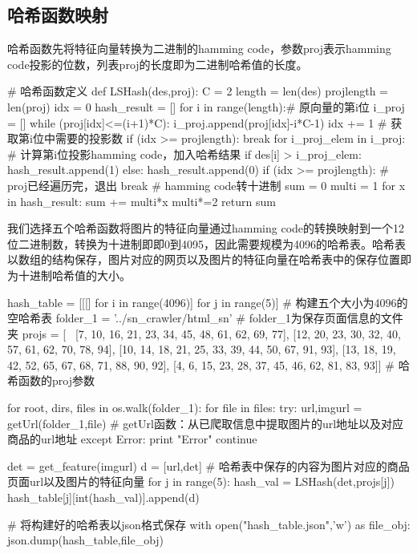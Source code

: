 \subsection{哈希函数映射}

哈希函数先将特征向量转换为二进制的hamming code，参数proj表示hamming code投影的位数，列表proj的长度即为二进制哈希值的长度。

\begin{python}
# 哈希函数定义
def LSHash(des,proj):
    C = 2
    length = len(des)
    projlength = len(proj)
    idx = 0
    hash_result = []
    for i in range(length):# 原向量的第i位
        i_proj = []
        while (proj[idx]<=(i+1)*C):
            i_proj.append(proj[idx]-i*C-1)
            idx += 1       # 获取第i位中需要的投影数
            if (idx >= projlength):
                break
        for i_proj_elem in i_proj:  # 计算第i位投影hamming code，加入哈希结果
            if des[i] > i_proj_elem:
                hash_result.append(1)
            else:
                hash_result.append(0)
        if (idx >= projlength):  # proj已经遍历完，退出
            break
    # hamming code转十进制
    sum = 0
    multi = 1
    for x in hash_result:
        sum += multi*x
        multi*=2
    return sum
\end{python}

我们选择五个哈希函数将图片的特征向量通过hamming code的转换映射到一个12位二进制数，转换为十进制即即0到4095，因此需要规模为4096的哈希表。哈希表以数组的结构保存，图片对应的网页以及图片的特征向量在哈希表中的保存位置即为十进制哈希值的大小。

\begin{python}
hash_table = [[[] for i in range(4096)] for j in range(5)] # 构建五个大小为4096的空哈希表
folder_1 = '../sn_crawler/html_sn' # folder_1为保存页面信息的文件夹
projs = [ \
    [7, 10, 16, 21, 23, 34, 45, 48, 61, 62, 69, 77], 
    [12, 20, 23, 30, 32, 40, 57, 61, 62, 70, 78, 94], 
    [10, 14, 18, 21, 25, 33, 39, 44, 50, 67, 91, 93], 
    [13, 18, 19, 42, 52, 65, 67, 68, 71, 88, 90, 92], 
    [4, 6, 15, 23, 28, 37, 45, 46, 62, 81, 83, 93]] # 哈希函数的proj参数

for root, dirs, files in os.walk(folder_1):
    for file in files:
        try:
            url,imgurl = getUrl(folder_1,file) # getUrl函数：从已爬取信息中提取图片的url地址以及对应商品的url地址
        except Error:
            print "Error"
            continue

        det = get_feature(imgurl)
        d = [url,det] # 哈希表中保存的内容为图片对应的商品页面url以及图片的特征向量
        for j in range(5):
            hash_val = LSHash(det,projs[j])
            hash_table[j][int(hash_val)].append(d)

# 将构建好的哈希表以json格式保存
with open("hash_table.json",'w') as file_obj:
    json.dump(hash_table,file_obj)
\end{python}